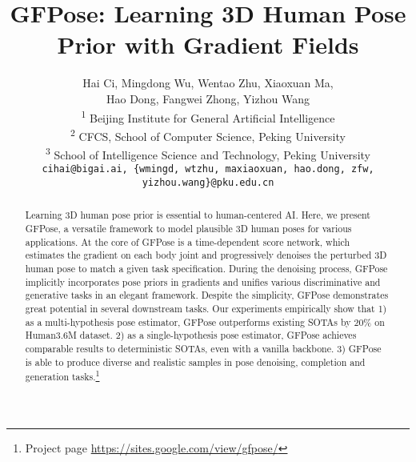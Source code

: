 \documentclass[10pt,twocolumn,letterpaper]{article}
\begin{document}
\title{GFPose: Learning 3D Human Pose Prior with Gradient Fields}

\author{Hai Ci, \quad Mingdong Wu, \quad 
Wentao Zhu, \quad Xiaoxuan Ma, \\
Hao Dong, \quad Fangwei Zhong, 
\quad Yizhou Wang\\
\textsuperscript{1} Beijing Institute for General Artificial Intelligence\\
\textsuperscript{2} CFCS, School of Computer Science, Peking University\\
\textsuperscript{3} School of Intelligence Science and Technology, Peking University\\
{\tt\small cihai@bigai.ai, \{wmingd, wtzhu, maxiaoxuan, hao.dong, zfw, yizhou.wang\}@pku.edu.cn}
}
\maketitle
\newcommand\mingdong[1]{\textcolor{teal}{WMD: #1}}

\newcommand{\loss}{\mathcal{L}}
\newcommand{\E}{\mathbb{E}}
\newcommand{\R}{\mathbb{R}}
\newcommand{\x}{x}
\newcommand{\z}{\mathbf{z}}
\newcommand{\N}{\mathcal{N}}
\newcommand{\X}{\mathcal{X}}
\newcommand{\C}{\mathcal{C}}
\newcommand{\data}{p_{data}}
\newcommand{\cond}{\mathbf{c}}
\newcommand{\pose}{\mathbf{x}}
\newcommand{\score}{\mathbf{s}_{\theta}}
\newcommand{\pscore}{\mathbf{\Phi}_{\theta}}
\newcommand\norm[1]{\left\lVert#1\right\rVert}

\newcommand{\npose}{\mathbf{\widetilde \x}}


\def\eg{\emph{e.g}.} \def\Eg{\emph{E.g}.}
\def\ie{\emph{i.e}.} \def\Ie{\emph{I.e}.}
\def\cf{\emph{c.f}.} \def\Cf{\emph{C.f}.}
\def\etc{\emph{etc}.} \def\vs{\emph{vs}.}
\def\wrt{w.r.t. } \def\dof{d.o.f. }
\def\etal{\emph{et al}. } 
\begin{abstract}
Learning 3D human pose prior is essential to human-centered AI.
Here, we present GFPose, a versatile framework to model plausible 3D human poses for various applications.
At the core of GFPose is a time-dependent score network, which estimates the gradient on each body joint and progressively denoises the perturbed 3D human pose to match a given task specification. 
During the denoising process, GFPose implicitly incorporates pose priors in gradients and unifies various discriminative and generative tasks in an elegant framework. 
    Despite the simplicity, GFPose demonstrates great potential in several downstream tasks. 
    Our experiments empirically show that 1) as a multi-hypothesis pose estimator, GFPose outperforms existing SOTAs by 20\% on Human3.6M dataset. 2) as a single-hypothesis pose estimator, GFPose achieves comparable results to deterministic SOTAs, even with a vanilla backbone. 3) GFPose is able to produce diverse and realistic samples in pose denoising, completion and generation tasks.\footnote{Project page \url{https://sites.google.com/view/gfpose/}}




\end{abstract} 
\vspace{-1.0em}
\end{document}
